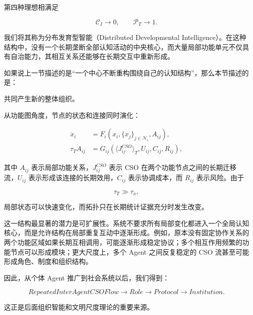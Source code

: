 第四种理想相满足

\begin{equation}
\mathcal{C}_{I}\rightarrow0,
\qquad
\mathcal{P}_{T}\rightarrow1.
\end{equation}

我们将其称为分布发育型智能（Distributed Developmental Intelligence）。在这种结构中，没有一个长期垄断全部认知活动的中央核心，而大量局部功能单元不仅具有自治能力，其相互关系还能够在长期交互中重新形成。

如果说上一节描述的是“一个中心不断重构围绕自己的认知结构”，那么本节描述的是：

\begin{statementbox}
\centering
{}
\end{statementbox}

共同产生新的整体组织。

从功能图角度，节点的状态和连接同时演化：

\begin{align}
\dot{x}_i
&=
F_i
\left(
x_i,
\{x_j\}_{j\in\mathcal{N}_i},
A_{ij}
\right),
\\
\tau_T\dot{A}_{ij}
&=
G_{ij}
\left(
\langle J^{CSO}_{ij}\rangle_T,
U_{ij},
C_{ij},
R_{ij}
\right),
\end{align}

其中 $A_{ij}$ 表示局部功能关系，$J^{CSO}_{ij}$ 表示 CSO 在两个功能节点之间的长期迁移流，$U_{ij}$ 表示形成该连接的长期效用，$C_{ij}$ 表示协调成本，而 $R_{ij}$ 表示风险。由于

\begin{equation}
\tau_T
\gg
\tau_x,
\end{equation}

局部状态可以快速变化，而拓扑只在长期统计证据充分时发生改变。

这一结构最显著的潜力是可扩展性。系统不要求所有局部变化都进入一个全局认知核心，而是允许结构在局部重复互动中逐渐形成。例如，原本没有固定协作关系的两个功能区域如果长期互相调用，可能逐渐形成稳定协议；多个相互作用频繁的功能节点可以形成模块；更大尺度上，多个 Agent 之间反复稳定的 CSO 流甚至可能形成角色、制度和组织结构。

因此，从个体 Agent 推广到社会系统以后，我们得到：

\begin{equation}
RepeatedInterAgentCSOFlow
\rightarrow
Role
\rightarrow
Protocol
\rightarrow
Institution.
\end{equation}

这正是后面组织智能和文明尺度理论的重要来源。


